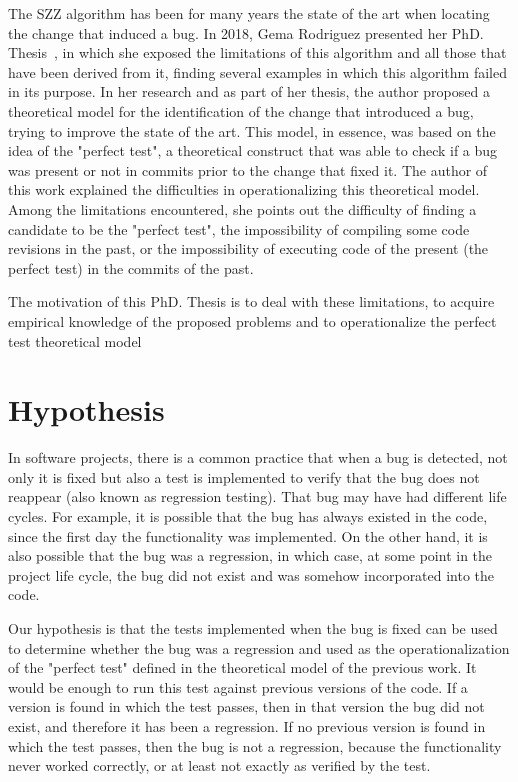 The SZZ algorithm has been for many years the state of the art when locating the change that induced a bug. 
In 2018, Gema Rodriguez presented her PhD. Thesis~\cite{rodriguez2018towards}, in which she exposed the limitations of this algorithm and all those that have been derived from it, finding several examples in which this algorithm failed in its purpose. 
In her research and as part of her thesis, the author proposed a theoretical model for the identification of the change that introduced a bug, trying to improve the state of the art. 
This model, in essence, was based on the idea of the "perfect test", a theoretical construct that was able to check if a bug was present or not in commits prior to the change that fixed it. The author of this work explained the difficulties in operationalizing this theoretical model. 
Among the limitations encountered, she points out the difficulty of finding a candidate to be the "perfect test", the impossibility of compiling some code revisions in the past, or the impossibility of executing code of the present (the perfect test) in the commits of the past.

The motivation of this PhD. Thesis is to deal with these limitations, to acquire empirical knowledge of the proposed problems and to operationalize the perfect test theoretical model

\section{Hypothesis}

In software projects, there is a common practice that when a bug is detected, not only it is fixed but also a test is implemented to verify that the bug does not reappear (also known as regression testing). 
That bug may have had different life cycles. 
For example, it is possible that the bug has always existed in the code, since the first day the functionality was implemented. 
On the other hand, it is also possible that the bug was a regression, in which case, at some point in the project life cycle, the bug did not exist and was somehow incorporated into the code. 

Our hypothesis is that the tests implemented when the bug is fixed can be used to determine whether the bug was a regression and used as the operationalization of the "perfect test" defined in the theoretical model of the previous work. 
It would be enough to run this test against previous versions of the code. 
If a version is found in which the test passes, then in that version the bug did not exist, and therefore it has been a regression. 
If no previous version is found in which the test passes, then the bug is not a regression, because the functionality never worked correctly, or at least not exactly as verified by the test.

